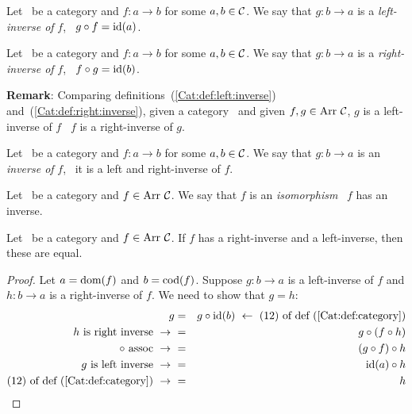 \begin{defin}\label{Cat:def:left:inverse}
    Let \Cat\ be a category and $f:a\to b$ for some $a,b\in\mbox{$\cal C$}$. 
    We say that $g:b \to a$ is a {\em left-inverse of} $f$, \ifand\ 
    $g\circ f=\mbox{\rm id}(a)$.
\end{defin}

\begin{defin}\label{Cat:def:right:inverse}
    Let \Cat\ be a category and $f:a\to b$ for some $a,b\in\mbox{$\cal C$}$. 
    We say that $g:b \to a$ is a {\em right-inverse of} $f$, \ifand\ 
    $f\circ g=\mbox{\rm id}(b)$.
\end{defin}

\noindent
{\bf Remark}: Comparing definitions~(\ref{Cat:def:left:inverse})
and~(\ref{Cat:def:right:inverse}), given a category \Cat\ and given 
$f,g\in\arr\ \Cat$, $g$ is a left-inverse of $f$ \ifand\ $f$ is a 
right-inverse of $g$.

\begin{defin}\label{Cat:def:inverse}
    Let \Cat\ be a category and $f:a\to b$ for some $a,b\in\mbox{$\cal C$}$. 
    We say that $g:b \to a$ is an {\em inverse of} $f$, \ifand\ 
    it is a left and right-inverse of $f$.
\end{defin}

\begin{defin}\label{Cat:def:isomorphism}
    Let \Cat\ be a category and $f\in\arr\ \Cat$. We say that $f$ is
    an {\em isomorphism} \ifand\ $f$ has an inverse.
\end{defin}

\begin{prop}\label{Cat:prop:inverse:left:right:inverse:equal}
    Let \Cat\ be a category and $f\in\arr\ \Cat$. If $f$
    has a right-inverse and a left-inverse, then these are equal.
\end{prop}
\begin{proof}
    Let $a=\mbox{\rm dom}(f)$ and $b=\mbox{\rm cod}(f)$. Suppose $g:b\to a$ is a left-inverse of 
    $f$ and $h:b \to a$ is a right-inverse of $f$. We need to show that $g=h$:
    \begin{eqnarray*}g
        &=&g\circ\id(b)\ \leftarrow\ 
        \mbox{$(12)$ of def~(\ref{Cat:def:category})}\\
        \mbox{$h$ is right inverse}\ \to\ 
        &=&g\circ(f\circ h)\\
        \mbox{$\circ$ assoc}\ \to\ 
        &=&(g\circ f)\circ h\\
        \mbox{$g$ is left inverse}\ \to\ 
        &=&\id(a)\circ h\\
        \mbox{$(12)$ of def~(\ref{Cat:def:category})}\ \to\ 
        &=&h
    \end{eqnarray*}
\end{proof}

